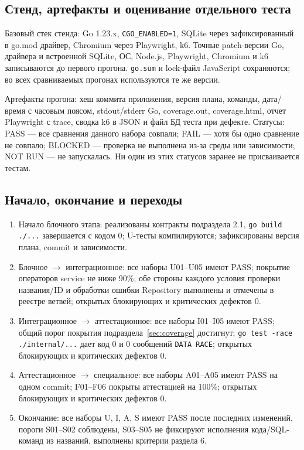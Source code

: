 \documentclass[12pt,a4paper]{extarticle}
\newcommand{\code}[1]{\nolinkurl{#1}}
\begin{document}
\subsection{Стенд, артефакты и оценивание отдельного теста}
Базовый стек стенда: Go 1.23.x, \code{CGO_ENABLED=1}, SQLite через
зафиксированный в go.mod драйвер, Chromium через Playwright, k6.
Точные patch-версии Go, драйвера и встроенной SQLite, ОС, Node.js,
Playwright, Chromium и k6 записываются до первого прогона.
\code{go.sum} и lock-файл JavaScript сохраняются;
во всех сравниваемых прогонах используются те же версии.

Артефакты прогона: хеш коммита приложения, версия плана,
команды, дата/время с часовым поясом, stdout/stderr Go,
coverage.out, coverage.html, отчет Playwright с trace,
сводка k6 в JSON и файл БД теста при дефекте.
Статусы: PASS --- все сравнения данного набора совпали;
FAIL --- хотя бы одно сравнение не совпало; BLOCKED --- проверка
не выполнена из-за среды или зависимости; NOT RUN --- не запускалась.
Ни один из этих статусов заранее не присваивается тестам.

\subsection{Начало, окончание и переходы}
\begin{enumerate}
\item Начало блочного этапа: реализованы контракты подраздела 2.1,
\code{go build ./...} завершается с кодом 0; U-тесты компилируются;
зафиксированы версия плана, commit и зависимости.
\item Блочное $\rightarrow$ интеграционное: все наборы U01--U05 имеют
PASS; покрытие операторов service не ниже 90\%; обе стороны каждого
условия проверки названия/ID и обработки ошибки Repository выполнены
и отмечены в реестре ветвей; открытых блокирующих и критических дефектов 0.
\item Интеграционное $\rightarrow$ аттестационное: все наборы I01--I05
имеют PASS; общий порог покрытия подраздела~\ref{sec:coverage} достигнут;
\code{go test -race ./internal/...} дает код 0 и 0 сообщений
\code{DATA RACE}; открытых блокирующих и критических дефектов 0.
\item Аттестационное $\rightarrow$ специальное: все наборы A01--A05
имеют PASS на одном commit; F01--F06 покрыты аттестацией на 100\%;
открытых блокирующих и критических дефектов 0.
\item Окончание: все наборы U, I, A, S имеют PASS после последних
изменений, пороги S01--S02 соблюдены, S03--S05 не фиксируют исполнения
кода/SQL-команд из названий, выполнены критерии раздела 6.
\end{enumerate}
\end{document}
